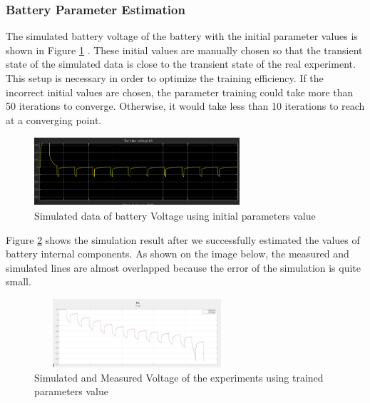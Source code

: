 \subsubsection{Battery Parameter Estimation}

The simulated battery voltage of the battery with the initial parameter values is shown in Figure \ref{fig:simulation} . These initial values are manually chosen so that the transient state of the simulated data is close to the transient state of the real experiment. This setup is necessary in order to optimize the training efficiency. If the incorrect initial values are chosen, the parameter training could take more than 50 iterations to converge. Otherwise, it would take less than 10 iterations to reach at a converging point.

\begin{figure}
\includegraphics[height=1in, width=3in]{figures/Simulation}
\caption{Simulated data of battery Voltage using initial parameters value}
\label{fig:simulation}
\end{figure}

Figure \ref{fig:simMeasured} shows the simulation result after we successfully estimated the values of battery internal components. As shown on the image below, the measured and simulated lines are almost overlapped because the error of the simulation is quite small.

\begin{figure}
\includegraphics[height=1in, width=3in]{figures/SimMeasures}
\caption{Simulated and Measured Voltage of the experiments using trained parameters value}
\label{fig:simMeasured}
\end{figure}


